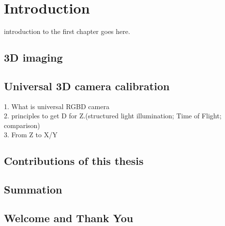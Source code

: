 
\chapter{Introduction} %
\label{sens_introduction} %
introduction to the first chapter goes here.

\section{3D imaging}
\section{Universal 3D camera calibration} %
1. What is universal RGBD camera\\
2. principles to get D for Z.(structured light illumination; Time of Flight; comparison)\\
3. From Z to X/Y

\section{Contributions of this thesis}
\section{Summation}
\section{Welcome and Thank You}


